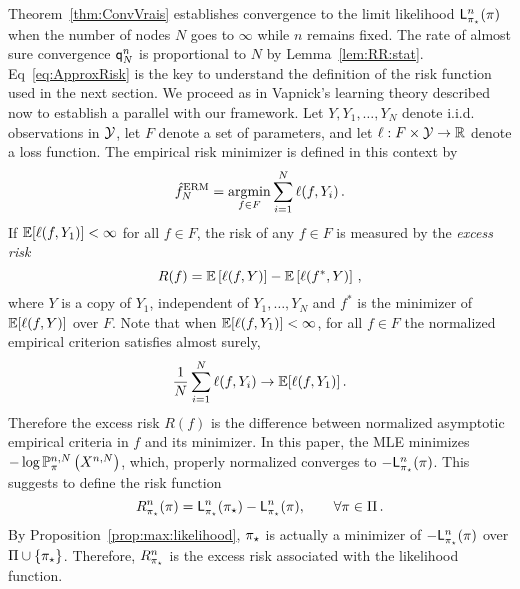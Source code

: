 Theorem~\ref{thm:ConvVrais} establishes convergence to the limit likelihood $\mathsf{L}^n_{\pi_{\star}}(\pi)$ when the number of nodes $N$ goes to $\infty$ while $n$ remains fixed. The rate of almost sure convergence ${\mathsf{q}}^{n}_{N}$ is proportional to $N$ by Lemma~\ref{lem:RR:stat}. Eq~\eqref{eq:ApproxRisk} is the key to understand the definition of the risk function used in the next section. We proceed as in Vapnick's learning theory \cite{MR1641250, MR0474638} described now to establish a parallel with our framework. Let $Y,Y_1,\ldots,Y_N$ denote i.i.d. observations in $\mathcal{Y}$, let $F$ denote a set of parameters, and let $\ell: F\times\mathcal{Y}\to\mathbb{R}$ denote a loss function. The empirical risk minimizer is defined in this context by
\[
\hat f_N^{\text{ERM}}=\operatorname*{argmin}_{f\in F}\sum_{i=1}^N\ell(f,Y_i)\,.
\]
If $\mathbb{E}[\ell(f,Y_1)]<\infty$ for all $f\in F$, the risk of any $f\in F$ is measured by the \emph{excess risk}  \cite{MassartNedelec2006}
\[
R(f)=\mathbb{E}\left[\ell(f,Y)\right]-\mathbb{E}\left[\ell(f^*,Y)\right]\,,
\]
where $Y$ is a copy of $Y_1$, independent of $Y_{1},\ldots,Y_N$ and $f^*$ is the minimizer of $\mathbb{E}[\ell(f,Y)]$ over $F$. Note that when $\mathbb{E}[\ell(f,Y_1)]<\infty$, for all $f\in F$ the normalized empirical criterion satisfies almost surely,
\[
\frac1N\sum_{i=1}^N\ell(f,Y_i)\to \mathbb{E}[\ell(f,Y_1)]\,.
\]
Therefore the excess risk $R(f)$ is the difference between normalized asymptotic empirical criteria in $f$ and its minimizer. In this paper, the MLE minimizes $-\log \mathbb{P}^{n,N}_{\pi}\left(X^{n,N}\right)$, which, properly normalized converges to $-\mathsf{L}^n_{\pi_{\star}}(\pi)$. This suggests to define the risk function
\begin{equation}\label{def:ExcessRisk}
R^n_{\pi_{\star}}(\pi)=\mathsf{L}^{n}_{\pi_{\star}}(\pi_{\star})-\mathsf{L}^{n}_{\pi_{\star}}(\pi),\qquad \forall\pi\in\Pi\,. 
\end{equation}
By Proposition~\ref{prop:max:likelihood}, $\pi_{\star}$ is actually a minimizer of $-\mathsf{L}^{n}_{\pi_{\star}}(\pi)$ over $\Pi\cup\{\pi_{\star}\}$. 
Therefore, $R^n_{\pi_{\star}}$ is the excess risk associated with the likelihood function.

